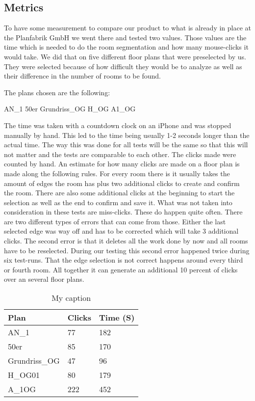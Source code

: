 \subsection{Metrics}
To have some measurement to compare our product to what is already in place at the Planfabrik GmbH we went there and tested two values. Those values are the time which is needed to do the room segmentation and how many mouse-clicks it would take. We did that on five different floor plans that were preselected by us. They were selected because of how difficult they would be to analyze as well as their difference in the number of rooms to be found.

The plans chosen are the following:

AN\_1
50er
Grundriss\_OG
H\_OG
A1\_OG


The time was taken with a countdown clock on an iPhone and was stopped manually by hand. This led to the time being usually 1-2 seconds longer than the actual time. The way this was done for all tests will be the same so that this will not matter and the tests are comparable to each other. The clicks made were counted by hand.
An estimate for how many clicks are made on a floor plan is made along the following rules. For every room there is it usually takes the amount of edges the room has plus two additional clicks to create and confirm the room. There are also some additional clicks at the beginning to start the selection as well as the end to confirm and save it.
What was not taken into consideration in these tests are miss-clicks. These do happen quite often. There are two different types of errors that can come from those. Either the last selected edge was way off and has to be corrected which will take 3 additional clicks. The second error is that it deletes all the work done by now and all rooms have to be reselected. During our testing this second error happened twice during six test-runs. That the edge selection is not correct happens around every third or fourth room. All together it can generate an additional 10 percent of clicks over an several floor plans.


\begin{table}[]
	\centering
	\caption{My caption}
	\label{my-label}
	\begin{tabular}{@{}lll@{}}
		\toprule
		Plan          & Clicks & Time (S) \\ \midrule
		AN\_1         & 77     & 182 \\
		50er          & 85     & 170  \\
		Grundriss\_OG & 47     & 96 \\
		H\_OG01         & 80     & 179 \\
		A\_1OG        & 222    & 452 \\ \bottomrule
	\end{tabular}
\end{table}

